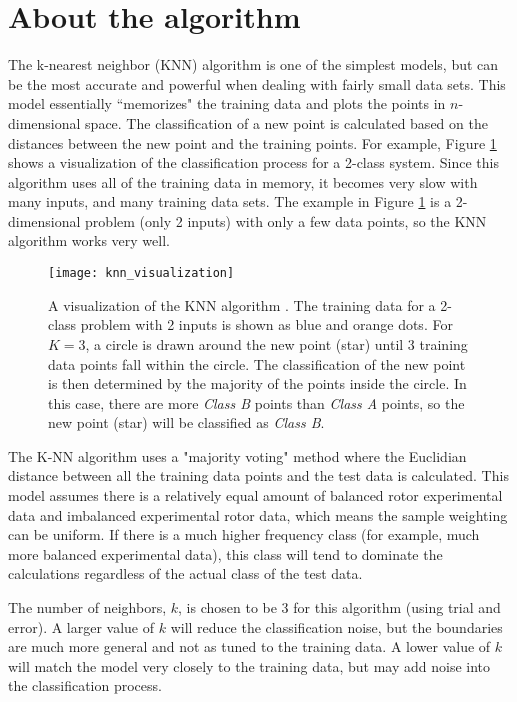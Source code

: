 \section{About the algorithm}
The k-nearest neighbor (KNN) algorithm is one of the simplest models, but can be the most accurate and powerful when dealing with fairly small data sets.  This model essentially ``memorizes" the training data and plots the points in $n$-dimensional space.  The classification of a new point is calculated based on the distances between the new point and the training points.  For example, Figure \ref{fig:knn_visualization} shows a visualization of the classification process for a 2-class system.  Since this algorithm uses all of the training data in memory, it becomes very slow with many inputs, and many training data sets.  The example in Figure \ref{fig:knn_visualization} is a 2-dimensional problem (only 2 inputs) with only a few data points, so the KNN algorithm works very well.


\begin{figure}
	\centering
	\texttt{[image: knn\_visualization]}
	\decoRule
	\caption{A visualization of the KNN algorithm \cite{knn_python}.  The training data for a 2-class problem with 2 inputs is shown as blue and orange dots.  For $K=3$, a circle is drawn around the new point (star) until 3 training data points fall within the circle.  The classification of the new point is then determined by the majority of the points inside the circle.  In this case, there are more \textit{Class B} points than \textit{Class A} points, so the new point (star) will be classified as \textit{Class B}.}
	\label{fig:knn_visualization}
\end{figure}

The K-NN algorithm uses a "majority voting" method where the Euclidian distance between all the training data points and the test data is calculated.  This model assumes there is a relatively equal amount of balanced rotor experimental data and imbalanced experimental rotor data, which means the sample weighting can be uniform.  If there is a much higher frequency class (for example, much more balanced experimental data), this class will tend to dominate the calculations regardless of the actual class of the test data.

The number of neighbors, $k$, is chosen to be 3 for this algorithm (using trial and error).  A larger value of $k$ will reduce the classification noise, but the boundaries are much more general and not as tuned to the training data.  A lower value of $k$ will match the model very closely to the training data, but may add noise into the classification process.

